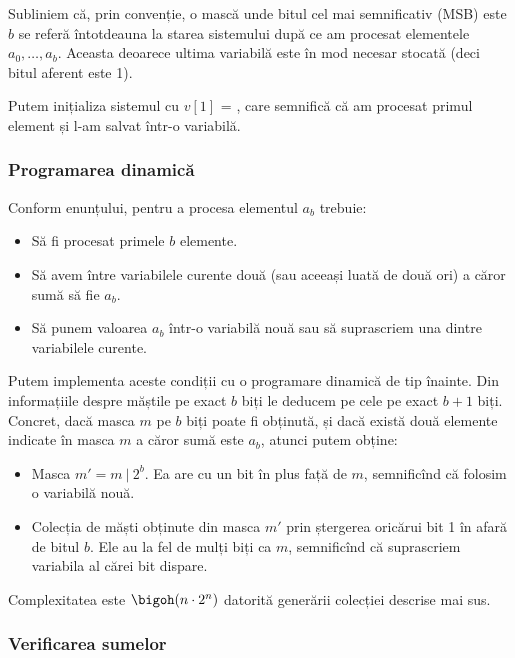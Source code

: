 Subliniem că, prin convenție, o mască unde bitul cel mai semnificativ (MSB) este $b$ se referă întotdeauna la starea sistemului după ce am procesat elementele $a_0, \dots, a_b$. Aceasta deoarece ultima variabilă este în mod necesar stocată (deci bitul aferent este 1).

Putem inițializa sistemul cu $v[1]$ = , care semnifică că am procesat primul element și l-am salvat într-o variabilă.

\subsubsection*{Programarea dinamică}

Conform enunțului, pentru a procesa elementul $a_b$ trebuie:

\begin{itemize}
  \item Să fi procesat primele $b$ elemente.
  \item Să avem între variabilele curente două (sau aceeași luată de două ori) a căror sumă să fie $a_b$.
  \item Să punem valoarea $a_b$ într-o variabilă nouă sau să suprascriem una dintre variabilele curente.
\end{itemize}

Putem implementa aceste condiții cu o programare dinamică de tip înainte. Din informațiile despre măștile pe exact $b$ biți le deducem pe cele pe exact $b+1$ biți. Concret, dacă masca $m$ pe $b$ biți poate fi obținută, și dacă există două elemente indicate în masca $m$ a căror sumă este $a_b$, atunci putem obține:

\begin{itemize}
  \item Masca $m' = m \ | \ 2^b$. Ea are cu un bit în plus față de $m$, semnificînd că folosim o variabilă nouă.

  \item Colecția de măști obținute din masca $m'$ prin ștergerea oricărui bit 1 în afară de bitul $b$. Ele au la fel de mulți biți ca $m$, semnificînd că suprascriem variabila al cărei bit dispare.
\end{itemize}

Complexitatea este $\bigoh(n \cdot 2^n)$ datorită generării colecției descrise mai sus.

\subsubsection*{Verificarea sumelor}


